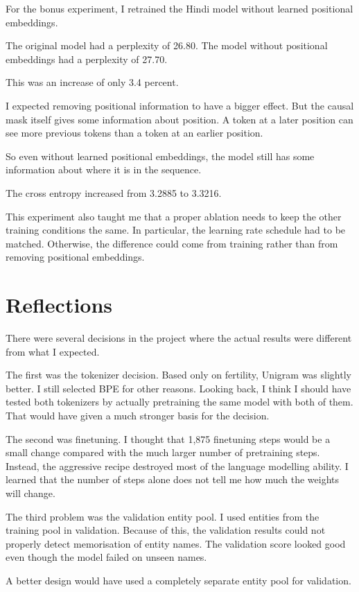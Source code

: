 \documentclass[twocolumn, 10pt]{article}
\begin{document}
For the bonus experiment, I retrained the Hindi model without learned positional embeddings.

The original model had a perplexity of 26.80. The model without positional embeddings had a perplexity of 27.70.

This was an increase of only 3.4 percent.

I expected removing positional information to have a bigger effect. But the causal mask itself gives some information about position. A token at a later position can see more previous tokens than a token at an earlier position.

So even without learned positional embeddings, the model still has some information about where it is in the sequence.

The cross entropy increased from 3.2885 to 3.3216.

This experiment also taught me that a proper ablation needs to keep the other training conditions the same. In particular, the learning rate schedule had to be matched. Otherwise, the difference could come from training rather than from removing positional embeddings.

\section{Reflections}
There were several decisions in the project where the actual results were different from what I expected.

The first was the tokenizer decision. Based only on fertility, Unigram was slightly better. I still selected BPE for other reasons. Looking back, I think I should have tested both tokenizers by actually pretraining the same model with both of them. That would have given a much stronger basis for the decision.

The second was finetuning. I thought that 1,875 finetuning steps would be a small change compared with the much larger number of pretraining steps. Instead, the aggressive recipe destroyed most of the language modelling ability. I learned that the number of steps alone does not tell me how much the weights will change.

The third problem was the validation entity pool. I used entities from the training pool in validation. Because of this, the validation results could not properly detect memorisation of entity names. The validation score looked good even though the model failed on unseen names.

A better design would have used a completely separate entity pool for validation.
\end{document}
